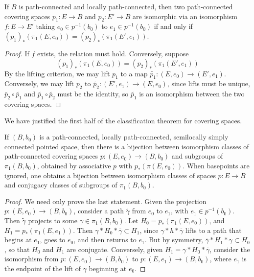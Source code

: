 \begin{theorem}
    If $B$ is path-connected and locally path-connected, then two path-connected covering spaces $p_1: E \to B$ and $p_2: E' \to B$ are isomorphic via an isomorphism $f: E \to E'$ taking $e_0 \in p^{-1}(b_0)$ to $e_1 \in p^{-1}(b_0)$ if and only if $(p_1)_*(\pi_1(E,e_0)) = (p_2)_*(\pi_1(E',e_1))$.
\end{theorem}
\begin{proof}
    If $f$ exists, the relation must hold. Conversely, suppose
    \[ (p_1)_*(\pi_1(E,e_0)) = (p_2)_*(\pi_1(E',e_1)) \]
    By the lifting criterion, we may lift $p_1$ to a map $\tilde{p_1}: (E,e_0) \to (E',e_1)$. Conversely, we may lift $p_2$ to $\tilde{p_2}: (E', e_1) \to (E,e_0)$, since lifts must be unique, $\tilde{p_2} \circ \tilde{p_1}$ and $\tilde{p_1} \circ \tilde{p_2}$ must be the identity, so $\tilde{p_1}$ is an isomorphism between the two covering spaces.
\end{proof}

We have justified the first half of the classification theorem for covering spaces.

\begin{theorem}
    If $(B,b_0)$ is a path-connected, locally path-connected, semilocally simply connected pointed space, then there is a bijection between isomorphism classes of path-connected covering spaces $p: (E,e_0) \to (B,b_0)$ and subgroups of $\pi_1(B,b_0)$, obtained by associative $p$ with $p_*(\pi(E,e_0))$. When basepoints are ignored, one obtains a bijection between isomorphism classes of spaces $p: E \to B$ and conjugacy classes of subgroups of $\pi_1(B,b_0)$.
\end{theorem}
\begin{proof}
    We need only prove the last statement. Given the projection $p: (E,e_0) \to (B,b_0)$, consider a path $\tilde{\gamma}$ from $e_0$ to $e_1$, with $e_1 \in p^{-1}(b_0)$. Then $\tilde{\gamma}$ projects to some $\gamma \in \pi_1(B,b_0)$. Let $H_0 = p_*(\pi_1(E,e_0))$, and $H_1 = p_*(\pi_1(E,e_1))$. Then $\gamma * H_0 * \overline{\gamma} \subset H_1$, since $\gamma * h * \overline{\gamma}$ lifts to a path that begins at $e_1$, goes to $e_0$, and then returns to $e_1$. But by symmetry, $\overline{\gamma} * H_1 * \gamma \subset H_0$, so that $H_0$ and $H_1$ are conjugate. Conversely, given $H_1 = \gamma * H_0 * \overline{\gamma}$, consider the isomorphism from $p: (E,e_0) \to (B,b_0)$ to $p: (E,e_1) \to (B,b_0)$, where $e_1$ is the endpoint of the lift of $\overline{\gamma}$ beginning at $e_0$.
\end{proof}







